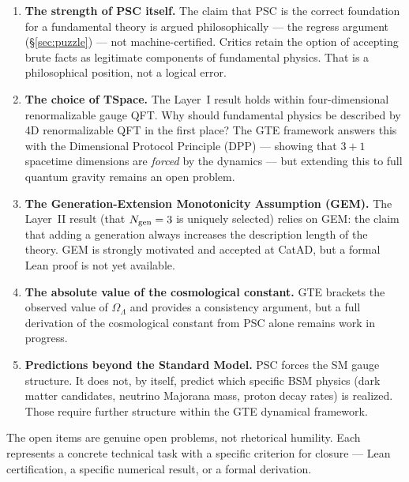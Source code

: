 \documentclass[11pt,a4paper]{article}
\begin{document}
\begin{tcolorbox}[colback=boxgray,colframe=gray!50!black,
  title=What PSC does NOT claim to derive,breakable]
\begin{enumerate}[leftmargin=1.5em,itemsep=6pt]

\item \textbf{The strength of PSC itself.}
The claim that PSC is the correct foundation for a fundamental theory is argued
philosophically — the regress argument (\S\ref{sec:puzzle}) — not machine-certified.
Critics retain the option of accepting brute facts as legitimate components of
fundamental physics.  That is a philosophical position, not a logical error.

\item \textbf{The choice of TSpace.}
The Layer~I result holds within four-dimensional renormalizable gauge QFT.
Why should fundamental physics be described by 4D renormalizable QFT in the first
place?  The GTE framework answers this with the Dimensional Protocol Principle
(DPP) — showing that $3{+}1$ spacetime dimensions are \emph{forced} by the
dynamics — but extending this to full quantum gravity remains an open problem.

\item \textbf{The Generation-Extension Monotonicity Assumption (GEM).}
The Layer~II result (that $N_{\rm gen} = 3$ is uniquely selected) relies on GEM:
the claim that adding a generation always increases the description length of the
theory.  GEM is strongly motivated and accepted at CatAD, but a formal Lean proof
is not yet available.

\item \textbf{The absolute value of the cosmological constant.}
GTE brackets the observed value of $\Omega_\Lambda$ and provides a consistency
argument, but a full derivation of the cosmological constant from PSC alone
remains work in progress.

\item \textbf{Predictions beyond the Standard Model.}
PSC forces the SM gauge structure.  It does not, by itself, predict which specific
BSM physics (dark matter candidates, neutrino Majorana mass, proton decay rates)
is realized.  Those require further structure within the GTE dynamical framework.
\end{enumerate}
\end{tcolorbox}

The open items are genuine open problems, not rhetorical humility.  Each represents
a concrete technical task with a specific criterion for closure — Lean certification,
a specific numerical result, or a formal derivation.
\end{document}
